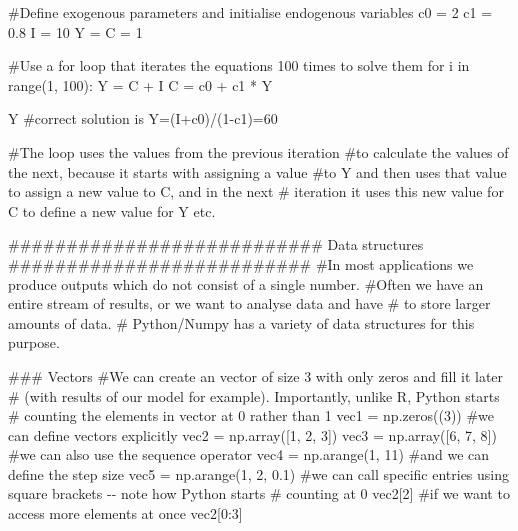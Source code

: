 \documentclass[
  letterpaper,
  DIV=11,
  numbers=noendperiod]{scrreprt}
\newenvironment{Shaded}{\begin{snugshade}}{\end{snugshade}}
\newcommand{\BuiltInTok}[1]{\textcolor[rgb]{0.00,0.23,0.31}{#1}}
\newcommand{\CommentTok}[1]{\textcolor[rgb]{0.37,0.37,0.37}{#1}}
\newcommand{\ControlFlowTok}[1]{\textcolor[rgb]{0.00,0.23,0.31}{#1}}
\newcommand{\DecValTok}[1]{\textcolor[rgb]{0.68,0.00,0.00}{#1}}
\newcommand{\FloatTok}[1]{\textcolor[rgb]{0.68,0.00,0.00}{#1}}
\newcommand{\KeywordTok}[1]{\textcolor[rgb]{0.00,0.23,0.31}{#1}}
\newcommand{\NormalTok}[1]{\textcolor[rgb]{0.00,0.23,0.31}{#1}}
\newcommand{\OperatorTok}[1]{\textcolor[rgb]{0.37,0.37,0.37}{#1}}
\begin{document}
\begin{tcolorbox}
\begin{Shaded}
\begin{Highlighting}[]
\CommentTok{\#Define exogenous parameters and initialise endogenous variables}
\NormalTok{c0 }\OperatorTok{=} \DecValTok{2}
\NormalTok{c1 }\OperatorTok{=} \FloatTok{0.8}
\NormalTok{I }\OperatorTok{=} \DecValTok{10}
\NormalTok{Y }\OperatorTok{=}\NormalTok{ C }\OperatorTok{=} \DecValTok{1}

\CommentTok{\#Use a for loop that iterates the equations 100 times to solve them}
\ControlFlowTok{for}\NormalTok{ i }\KeywordTok{in} \BuiltInTok{range}\NormalTok{(}\DecValTok{1}\NormalTok{, }\DecValTok{100}\NormalTok{):}
\NormalTok{    Y }\OperatorTok{=}\NormalTok{ C }\OperatorTok{+}\NormalTok{ I}
\NormalTok{    C }\OperatorTok{=}\NormalTok{ c0 }\OperatorTok{+}\NormalTok{ c1 }\OperatorTok{*}\NormalTok{ Y}

\NormalTok{Y}
\CommentTok{\#correct solution is Y=(I+c0)/(1{-}c1)=60}

\CommentTok{\#The loop uses the values from the previous iteration}
\CommentTok{\#to calculate the values of the next, because it starts with assigning a value }
\CommentTok{\#to Y and then uses that value to assign a new value to C, and in the next}
\CommentTok{\# iteration it uses this new value for C to define a new value for Y etc.}


\CommentTok{\#\#\#\#\#\#\#\#\#\#\#\#\#\#\#\#\#\#\#\#\#\#\#\#\#\#\# Data structures \#\#\#\#\#\#\#\#\#\#\#\#\#\#\#\#\#\#\#\#\#\#\#\#\#\#}
\CommentTok{\#In most applications we produce outputs which do not consist of a single number.}
\CommentTok{\#Often we have an entire stream of results, or we want to analyse data and have }
\CommentTok{\# to store larger amounts of data. }
\CommentTok{\# Python/Numpy has a variety of data structures for this purpose.}


\CommentTok{\#\#\# Vectors}
\CommentTok{\#We can create an vector of size 3 with only zeros and fill it later }
\CommentTok{\# (with results of our model for example). Importantly, unlike R, Python starts}
\CommentTok{\# counting the elements in vector at 0 rather than 1}
\NormalTok{vec1 }\OperatorTok{=}\NormalTok{ np.zeros((}\DecValTok{3}\NormalTok{)) }
\CommentTok{\#we can define vectors explicitly }
\NormalTok{vec2 }\OperatorTok{=}\NormalTok{ np.array([}\DecValTok{1}\NormalTok{, }\DecValTok{2}\NormalTok{, }\DecValTok{3}\NormalTok{])}
\NormalTok{vec3 }\OperatorTok{=}\NormalTok{ np.array([}\DecValTok{6}\NormalTok{, }\DecValTok{7}\NormalTok{, }\DecValTok{8}\NormalTok{])}
\CommentTok{\#we can also use the sequence operator}
\NormalTok{vec4 }\OperatorTok{=}\NormalTok{ np.arange(}\DecValTok{1}\NormalTok{, }\DecValTok{11}\NormalTok{)}
\CommentTok{\#and we can define the step size}
\NormalTok{vec5 }\OperatorTok{=}\NormalTok{ np.arange(}\DecValTok{1}\NormalTok{, }\DecValTok{2}\NormalTok{, }\FloatTok{0.1}\NormalTok{)}
\CommentTok{\#we can call specific entries using square brackets {-}{-} note how Python starts }
\CommentTok{\# counting at 0}
\NormalTok{vec2[}\DecValTok{2}\NormalTok{]}
\CommentTok{\#if we want to access more elements at once}
\NormalTok{vec2[}\DecValTok{0}\NormalTok{:}\DecValTok{3}\NormalTok{]}


\end{Highlighting}
\end{Shaded}
\end{tcolorbox}
\end{document}
